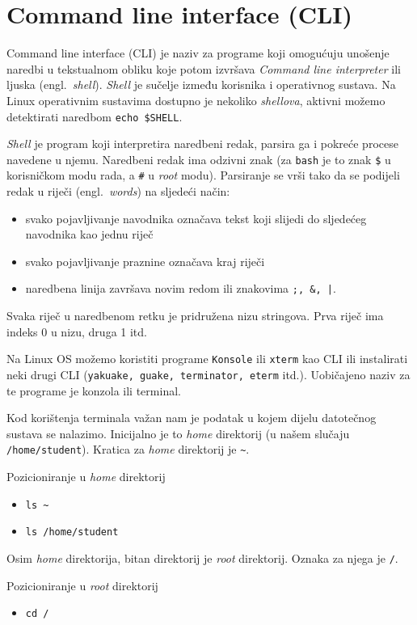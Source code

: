 
\section{Command line interface (CLI)}
Command line interface (CLI) je naziv za programe koji omogućuju unošenje naredbi u tekstualnom obliku koje potom izvršava \textit{Command line interpreter} ili ljuska (engl.~\textit{shell}). \textit{Shell} je sučelje između korisnika i operativnog sustava. Na Linux operativnim sustavima dostupno je nekoliko \textit{shellova}, aktivni možemo detektirati naredbom \lstinline!echo $SHELL!.

\textit{Shell} je program koji interpretira naredbeni redak, parsira ga i pokreće procese navedene u njemu. Naredbeni redak ima odzivni znak (za \texttt{bash} je to znak \lstinline!$! u korisničkom modu rada, a \lstinline!#! u \textit{root} modu). Parsiranje se vrši tako da se podijeli redak u riječi (engl.~\textit{words}) na sljedeći način:
\begin{itemize}
 \item svako pojavljivanje navodnika označava tekst koji slijedi do sljedećeg navodnika kao jednu riječ
 \item svako pojavljivanje praznine označava kraj riječi
 \item naredbena linija završava novim redom ili znakovima \lstinline!;, &, |!.
\end{itemize}
Svaka riječ u naredbenom retku je pridružena nizu stringova. Prva riječ ima indeks 0 u nizu, druga 1 itd.

Na Linux OS možemo koristiti programe \texttt{Konsole} ili \texttt{xterm} kao CLI  ili instalirati neki drugi CLI (\texttt{yakuake, guake, terminator, eterm} itd.). Uobičajeno naziv za te programe je konzola ili terminal.

Kod korištenja terminala važan nam je podatak u kojem dijelu datotečnog sustava se nalazimo. Inicijalno je to \textit{home} direktorij (u našem slučaju \texttt{/home/student}). Kratica za \textit{home} direktorij je \lstinline!~!.

\begin{primjer}
Pozicioniranje u \textit{home} direktorij
\begin{itemize}
\item \lstinline!ls ~! 
\item \lstinline!ls /home/student! 
\end{itemize}
\end{primjer}

Osim \textit{home} direktorija, bitan direktorij je \textit{root} direktorij. Oznaka za njega je \lstinline!/!.
\begin{primjer}
Pozicioniranje u \textit{root} direktorij
\begin{itemize}
 \item \lstinline!cd /!
\end{itemize}

\end{primjer}


